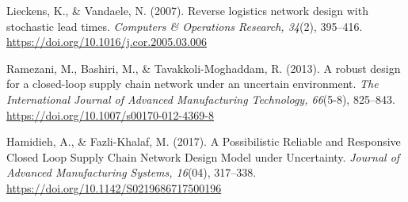 \begin{thebibliography}{99}
Lieckens, K., \& Vandaele, N. (2007). Reverse logistics network design with stochastic lead times. \textit{Computers \& Operations Research, 34}(2), 395--416. \href{https://doi.org/10.1016/j.cor.2005.03.006}{https://doi.org/10.1016/j.cor.2005.03.006}

Ramezani, M., Bashiri, M., \& Tavakkoli-Moghaddam, R. (2013). A robust design for a closed-loop supply chain network under an uncertain environment. \textit{The International Journal of Advanced Manufacturing Technology, 66}(5-8), 825--843. \href{https://doi.org/10.1007/s00170-012-4369-8}{https://doi.org/10.1007/s00170-012-4369-8}

Hamidieh, A., \& Fazli-Khalaf, M. (2017). A Possibilistic Reliable and Responsive Closed Loop Supply Chain Network Design Model under Uncertainty. \textit{Journal of Advanced Manufacturing Systems, 16}(04), 317--338. \href{https://doi.org/10.1142/S0219686717500196}{https://doi.org/10.1142/S0219686717500196}

\end{thebibliography}